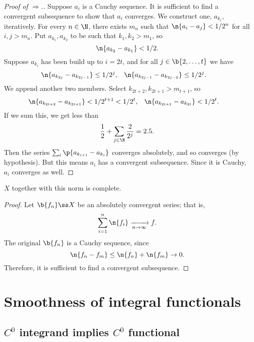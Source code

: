 \begin{proof}[Proof of $\Rightarrow$.]
  Suppose $a_i$ is a Cauchy sequence.
  It is sufficient to find a convergent subsequence to show that $a_i$ converges.
  We construct one, $a_{k_i}$, iteratively.
  For every $n \in \N$, there exists $m_n$ such that $\n{a_i-a_j} < 1/2^n$ for all $i,j > m_n$.
  Put $a_{k_1}, a_{k_2}$ to be such that $k_1, k_2 > m_1$, so
  $$ \n{a_{k_2} - a_{k_1}} < 1/2. $$
  Suppose $a_{k_i}$ has been build up to $i = 2t$, and for all $j \in \b{2, \dots, t}$ we have
  \begin{align*}
    \n{a_{k_{2j}}-a_{k_{2j-1}}} &\le 1/2^{j}, &
    \n{a_{k_{2j-1}}-a_{k_{2j-2}}} &\le 1/2^{j}.
  \end{align*}
  We append another two members. Select $k_{2t+2}, k_{2t+1} > m_{t+1}$, so
  \begin{align*}
    \n{a_{k_{2t+2}}-a_{k_{2t+1}}} &< 1/2^{t+1} < 1/2^t, &
    \n{a_{k_{2t+1}}-a_{k_{2t}}} &< 1/2^{t}.
  \end{align*}
  If we sum this, we get less than
  \begin{align*}
    \frac{1}{2} + \sum_{j \in \N} \frac{2}{2^j}
    = 2.5.
  \end{align*}
  Then the series $\sum_i \p{a_{k_{i+1}}-a_{k_i}}$ converges absolutely, and so converges (by hypothesis). But this means $a_i$ has a convergent subsequence. Since it is Cauchy, $a_i$ converges as well.
\end{proof}

\begin{exercise}
  $X$ together with this norm is complete.
\end{exercise}

\begin{proof}
  Let $\b{f_n} \ss X$ be an absolutely convergent series; that is,
  $$ \sum_{i=1}^n \n{f_i} \xrightarrow[n \to \infty]{} f. $$
  The original $\b{f_n}$ is a Cauchy sequence, since
  $$ \n{f_n-f_m} \le  \n{f_n} + \n{f_m} \to 0. $$
  Therefore, it is sufficient to find a convergent subsequence.
\end{proof}

\section{Smoothness of integral functionals}

\subsection{$C^0$ integrand implies $C^0$ functional}

